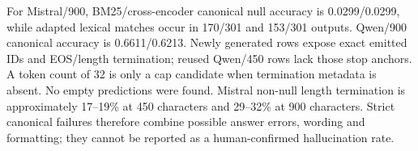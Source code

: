 For Mistral/900, BM25/cross-encoder canonical null accuracy is 0.0299/0.0299, while adapted lexical matches occur in 170/301 and 153/301 outputs. Qwen/900 canonical accuracy is 0.6611/0.6213. Newly generated rows expose exact emitted IDs and EOS/length termination; reused Qwen/450 rows lack those stop anchors. A token count of 32 is only a cap candidate when termination metadata is absent. No empty predictions were found. Mistral non-null length termination is approximately 17--19\% at 450 characters and 29--32\% at 900 characters. Strict canonical failures therefore combine possible answer errors, wording and formatting; they cannot be reported as a human-confirmed hallucination rate.

\FloatBarrier
